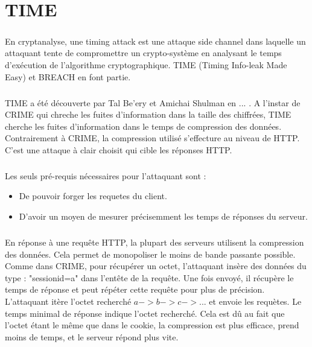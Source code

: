 \chapter{TIME}
\label{chapter:time}

\paragraph{}
En cryptanalyse, une timing attack est une attaque side channel dans laquelle un attaquant tente de compromettre un crypto-système en analysant le temps d'exécution de l'algorithme cryptographique. TIME (Timing Info-leak Made Easy) et BREACH en font partie.

\paragraph{}
TIME a été découverte par Tal Be'ery et Amichai Shulman en ... . A l'instar de CRIME qui chreche les fuites d'information dans la taille des chiffrées, TIME cherche les fuites d'information dans le temps de compression des données. Contrairement à CRIME, la compression utilisé s'effecture au niveau de HTTP.
C'est une attaque à clair choisit qui cible les réponses HTTP.

\paragraph{}
Les seuls pré-requis nécessaires pour l'attaquant sont :
\begin{itemize}
  \item De pouvoir forger les requetes du client.
  \item D'avoir un moyen de mesurer précisemment les temps de réponses du serveur.
\end{itemize}

\paragraph{}
En réponse à une requête HTTP, la plupart des serveurs utilisent la compression des données. Cela permet de monopoliser le moins de bande passante possible.
Comme dans CRIME, pour récupérer un octet, l'attaquant insère des données du type : "sessionid=a" dans l'entête de la requête. Une fois envoyé, il récupère le temps de réponse et peut répéter cette requête pour plus de précision. 
L'attaquant itère l'octet recherché \(a -> b -> c -> ...\) et envoie les requètes. Le temps minimal de réponse indique l'octet recherché. Cela est dû au fait que l'octet étant le même que dans le cookie, la compression est plus efficace, prend moins de temps, et le serveur répond plus vite.
